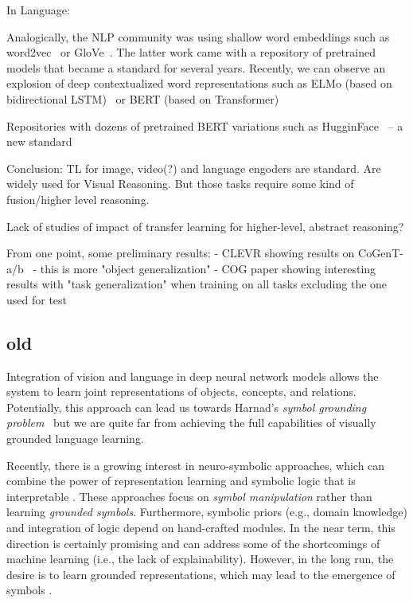 In Language:

Analogically, the NLP community was using shallow word embeddings such as word2vec~\cite{mikolov2013distributed} or GloVe~\cite{pennington2014glove}.
The latter work came with a repository of pretrained models that became a standard for several years.
Recently, we can observe an explosion of deep contextualized word representations such as ELMo (based on bidirectional LSTM)~\cite{peters2018deep} or BERT (based on Transformer)~\cite{devlin2018bert}

Repositories with dozens of pretrained BERT variations such as HugginFace~\cite{wolf2019transformers} -- a new standard



Conclusion:
TL for image, video(?) and language engoders are standard.
Are widely used for Visual Reasoning. But those tasks require some kind of fusion/higher level reasoning.
 
Lack of studies of impact of transfer learning for higher-level, abstract reasoning?

From one point, some preliminary results:
 - CLEVR showing results on CoGenT-a/b~\cite{johnson2017clevr} - this is more "object generalization"
 - COG paper showing interesting results with "task generalization" when training on all tasks excluding the one used for test~\cite{yang2018dataset}


\subsection{old}
Integration of vision and language in deep neural network models allows the system to learn joint representations of objects, concepts, and relations.  Potentially, this approach can lead us towards Harnad's \textit{symbol grounding problem}~\cite{harnad2003symbol} but we are quite far from achieving the full capabilities of visually grounded language learning.

Recently, there is a growing interest in neuro-symbolic approaches, which can combine the power of representation learning and symbolic logic that is interpretable \cite{mao2019neurosymbolic}. These approaches focus on \textit{symbol manipulation} rather than learning \textit{grounded symbols}.  Furthermore, symbolic priors (e.g., domain knowledge) and integration of logic depend on hand-crafted modules.  In the near term, this direction is certainly promising and can address some of the shortcomings of machine learning (i.e., the lack of explainability)\cite{vedantam2019probabilistic}.  However, in the long run, the desire is to learn grounded representations, which may lead to the emergence of symbols \cite{taniguchi2018symbol}.

